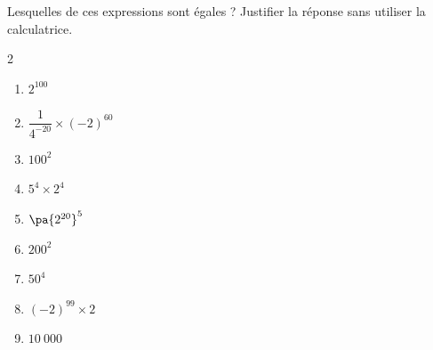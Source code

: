 \begin{exo}{}
	Lesquelles de ces expressions sont égales ? Justifier la réponse sans utiliser la calculatrice.
	\vspace*{-2mm}\begin{multicols}{2}
	\begin{enumerate}[itemsep=2mm]
		\item $2^{100}$
		\item $\dfrac{1}{4^{-20}} \times (-2)^{60}$
		\item $100^2$
		\item $5^4 \times 2^4$
		\item $\pa{2^{20}}^5$
		\item $200^2$
		\item $50^4$
		\item $(-2)^{99} \times 2$
		\item $10\ 000$
	\end{enumerate}
	\end{multicols}
\end{exo}
